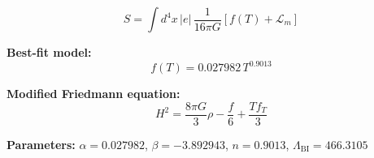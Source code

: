 
\begin{equation}
  S = \int d^4x \, |e| \, \frac{1}{16\pi G} \left[ f(T) + \mathcal{L}_m \right]
\end{equation}

\textbf{Best-fit model:}
\begin{equation}
  f(T) = 0.027982 \, T^{0.9013}
\end{equation}

\textbf{Modified Friedmann equation:}
\begin{equation}
  H^2 = \frac{8\pi G}{3} \rho - \frac{f}{6} + \frac{T f_T}{3}
\end{equation}

\textbf{Parameters:}
$\alpha = 0.027982$, \quad
$\beta = -3.892943$, \quad
$n = 0.9013$, \quad
$\Lambda_{\text{BI}} = 466.3105$